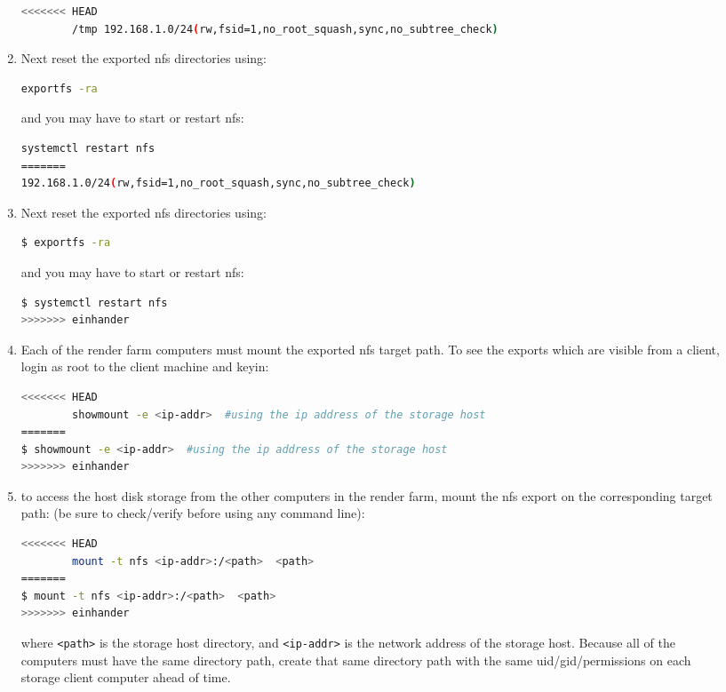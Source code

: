 \begin{description}
\begin{enumerate}
\begin{lstlisting}[language=bash]
<<<<<<< HEAD
        /tmp 192.168.1.0/24(rw,fsid=1,no_root_squash,sync,no_subtree_check)
        \end{lstlisting}
        \item Next reset the exported nfs directories using: 
        \begin{lstlisting}[language=bash]
        exportfs -ra
        \end{lstlisting} 
        and you may have to start or restart nfs: 
        \begin{lstlisting}[language=bash]
        systemctl restart nfs
=======
192.168.1.0/24(rw,fsid=1,no_root_squash,sync,no_subtree_check)
        \end{lstlisting}
        \item Next reset the exported nfs directories using: 
        \begin{lstlisting}[language=bash]
$ exportfs -ra
        \end{lstlisting} 
        and you may have to start or restart nfs: 
        \begin{lstlisting}[language=bash]
$ systemctl restart nfs
>>>>>>> einhander
        \end{lstlisting}
        \item Each of the render farm computers must mount the exported nfs target path.  To see the exports
        which are visible from a client, login as root to the client machine and keyin:
        \begin{lstlisting}[language=bash]
<<<<<<< HEAD
        showmount -e <ip-addr>  #using the ip address of the storage host
=======
$ showmount -e <ip-addr>  #using the ip address of the storage host
>>>>>>> einhander
        \end{lstlisting}
        \item to access the host disk storage from the other computers in the render farm, mount the nfs export on
        the corresponding target path: (be sure to check/verify before using any command line):
        \begin{lstlisting}[language=bash]
<<<<<<< HEAD
        mount -t nfs <ip-addr>:/<path>  <path>
=======
$ mount -t nfs <ip-addr>:/<path>  <path>
>>>>>>> einhander
        \end{lstlisting}
        where \texttt{<path>} is the storage host directory, and \texttt{<ip-addr>} is the network address of the storage host.        
        Because all of the computers must have the same directory path, create that same directory path with the same uid/gid/permissions on each storage client computer ahead of time.

\end{enumerate}
\end{description}
